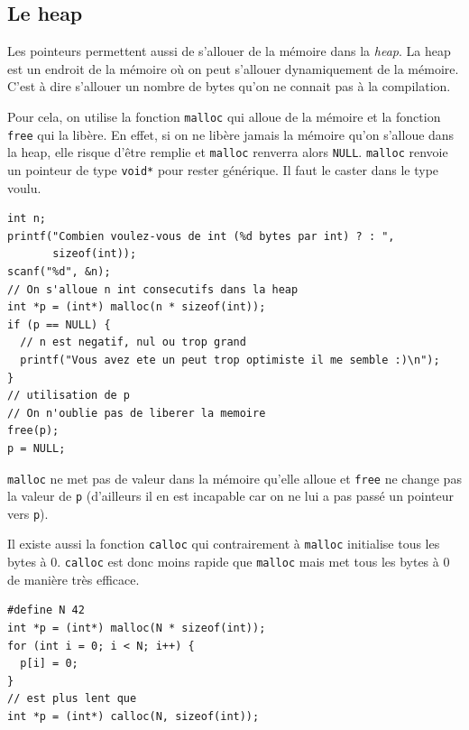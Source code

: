 \subsection{Le heap}
Les pointeurs permettent aussi de s'allouer de la mémoire dans la \emph{heap}.
La heap est un endroit de la mémoire où on peut s'allouer dynamiquement
de la mémoire.
C'est à dire s'allouer un nombre de bytes
qu'on ne connait pas à la compilation.

Pour cela, on utilise la fonction \lstinline|malloc| qui alloue de la mémoire
et la fonction \lstinline|free| qui la libère.
En effet, si on ne libère jamais la mémoire qu'on s'alloue dans la heap,
elle risque d'être remplie et \lstinline|malloc| renverra alors
\lstinline|NULL|.
\lstinline|malloc| renvoie un pointeur de type \lstinline|void*|
pour rester générique.
Il faut le caster dans le type voulu.
\begin{lstlisting}
int n;
printf("Combien voulez-vous de int (%d bytes par int) ? : ",
       sizeof(int));
scanf("%d", &n);
// On s'alloue n int consecutifs dans la heap
int *p = (int*) malloc(n * sizeof(int));
if (p == NULL) {
  // n est negatif, nul ou trop grand
  printf("Vous avez ete un peut trop optimiste il me semble :)\n");
}
// utilisation de p
// On n'oublie pas de liberer la memoire
free(p);
p = NULL;
\end{lstlisting}

\lstinline|malloc| ne met pas de valeur dans la mémoire qu'elle alloue
et \lstinline|free| ne change pas la valeur de \lstinline|p|
(d'ailleurs il en est incapable car on ne lui a pas passé un pointeur
vers \lstinline|p|).

Il existe aussi la fonction \lstinline|calloc| qui contrairement à
\lstinline|malloc| initialise tous les bytes à 0.
\lstinline|calloc| est donc moins rapide que \lstinline|malloc| mais
met tous les bytes à 0 de manière très efficace.
\begin{lstlisting}
#define N 42
int *p = (int*) malloc(N * sizeof(int));
for (int i = 0; i < N; i++) {
  p[i] = 0;
}
// est plus lent que
int *p = (int*) calloc(N, sizeof(int));
\end{lstlisting}

